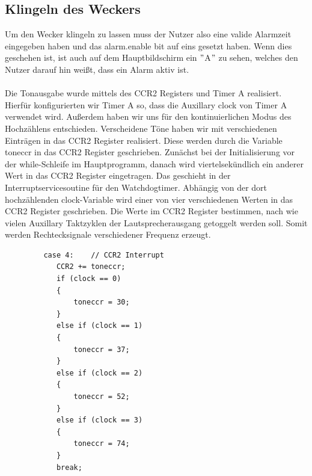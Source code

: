 \documentclass[openright,twoside,11pt,a4paper]{scrartcl}
\begin{document}
\begin{flushleft}
	 	\subsection{Klingeln des Weckers}
	 	Um den Wecker klingeln zu lassen muss der Nutzer also eine valide Alarmzeit eingegeben haben und das alarm.enable bit auf eins gesetzt haben. Wenn dies geschehen ist, ist auch auf dem Hauptbildschirm ein $"$A$"$ zu sehen, welches den Nutzer darauf hin weißt, dass ein Alarm aktiv ist. \\
	 	\ \\
	 	Die Tonausgabe wurde mittels des CCR2 Registers und Timer A realisiert. Hierfür konfigurierten wir Timer A so, dass die Auxillary clock von Timer A verwendet wird. Außerdem haben wir uns für den kontinuierlichen Modus des Hochzählens entschieden. Verscheidene Töne haben wir mit verschiedenen Einträgen in das CCR2 Register realisiert. Diese werden durch die Variable toneccr in das CCR2 Register geschrieben. Zunächst bei der Initialisierung vor der while-Schleife im Hauptprogramm, danach wird viertelsekündlich ein anderer Wert in das CCR2 Register eingetragen. Das geschieht in der Interruptservicesoutine für den Watchdogtimer. Abhängig von der dort hochzählenden clock-Variable wird einer von vier verschiedenen Werten in das CCR2 Register geschrieben. Die Werte im CCR2 Register bestimmen, nach wie vielen Auxillary Taktzyklen der Lautsprecherausgang getoggelt werden soll. Somit werden Rechtecksignale verschiedener Frequenz erzeugt.
	 	\begin{lstlisting}
	 	 case 4:	// CCR2 Interrupt
	 		CCR2 += toneccr;
		 	if (clock == 0)
		 	{
		 		toneccr = 30;
		 	}
		 	else if (clock == 1)
		 	{
		 		toneccr = 37;
		 	}
		 	else if (clock == 2)
		 	{
		 		toneccr = 52;
		 	}
		 	else if (clock == 3)
		 	{
		 		toneccr = 74;
		 	}
	 		break;
	 	\end{lstlisting}

	 	

\end{flushleft}
\end{document}
